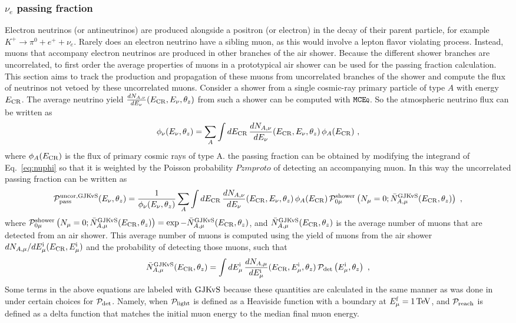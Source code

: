 \subsubsection{$\nu_e$ passing fraction}
Electron neutrinos (or antineutrinos) are produced alongside a positron (or electron) in the decay of their parent particle, for example $K^+ \rightarrow \pi^0 + e^+ + \nu_e$.
Rarely does an electron neutrino have a sibling muon, as this would involve a lepton flavor violating process.
Instead, muons that accompany electron neutrinos are produced in other branches of the air shower.
Because the different shower branches are uncorrelated, to first order the average properties of muons in a prototypical air shower can be used for the passing fraction calculation.
This section aims to track the production and propagation of these muons from uncorrelated branches of the shower and compute the flux of neutrinos not vetoed by these uncorrelated muons.
Consider a shower from a single cosmic-ray primary particle of type $A$ with energy $E_{\rm CR}$.
The average neutrino yield $\frac{dN_{A, \nu}}{dE_\nu}(E_{\rm CR}, E_\nu, \theta_z)$ from such a shower can be computed with $\texttt{MCE{\scriptsize Q}}$.
So the atmospheric neutrino flux can be written as 
\begin{equation}
\label{eq:nuphi}
\phi_\nu(E_\nu, \theta_z)  = \sum_A \int dE_{\rm CR} \, \frac{dN_{A, \nu}}{dE_\nu}(E_{\rm CR}, E_\nu, \theta_z) \, \phi_A(E_{\rm CR})~,
\end{equation}
where $\phi_A(E_{\rm CR})$ is the flux of primary cosmic rays of type A.
the passing fraction can be obtained by modifying the integrand of Eq.~\ref{eq:nuphi} so that it is weighted by the Poisson probability $Pzmproto$ of detecting an accompanying muon.
In this way the uncorrelated passing fraction can be written as
\begin{equation}
\label{eq:PuncorGJKvS}
{\mathcal P}_{\rm pass}^{\rm uncor, GJKvS}(E_\nu, \theta_z)  =  \frac{1}{\phi_\nu(E_\nu, \theta_z)} \sum_A \int dE_{\rm CR} \, \frac{dN_{A, \nu}}{dE_\nu}(E_{\rm CR}, E_\nu, \theta_z) \, \phi_A(E_{\rm CR}) \, {\mathcal P}_{0\mu}^{\rm shower} \left(N_\mu = 0  ; \bar N_{A, \mu}^{\rm GJKvS}(E_{\rm CR}, \theta_z)\right)~,
\end{equation}
where ${\mathcal P}_{0\mu}^{\rm shower} \left(N_\mu = 0  ; \bar N_{A, \mu}^{\rm GJKvS}(E_{\rm CR}, \theta_z)\right) = \exp{-\bar N_{A, \mu}^{\rm GJKvS}(E_{\rm CR}, \theta_z)}$,
and  $\bar N_{A, \mu}^{\rm GJKvS}(E_{\rm CR}, \theta_z)$ is the average number of muons that are detected from an air shower.
This average number of muons is computed using the yield of muons from the air shower $dN_{A, \mu}/dE_{\mu}^{\rm i}(E_{\rm CR}, E_{\mu}^{\rm i})$ and the probability of detecting those muons, such that
\begin{equation}
\label{eq:Nmu}
\bar N_{A, \mu}^{\rm GJKvS}(E_{\rm CR},\theta_z) = \int dE_{\mu}^{\rm i} \, \frac{dN_{A, \mu}}{dE_{\mu}^{\rm i}}(E_{\rm CR}, E_{\mu}^{\rm i},  \theta_z) \, {\mathcal P}_{\rm det}\left(E_{\mu}^{\rm i} , \theta_z\right) ~,
\end{equation}
Some terms in the above equations are labeled with ${\rm GJKvS}$ because these quantities are calculated in the same manner as was done in~\cite{Gaisser:2014bja} under certain choices for ${\mathcal P}_{\rm det}$.
Namely, when ${\mathcal P}_{\rm light}$ is defined as a Heaviside function with a boundary at $\Emf = \SI{1}\TeV$, and ${\mathcal P}_{\rm reach}$ is defined as a delta function that matches the initial muon energy to the median final muon energy.

